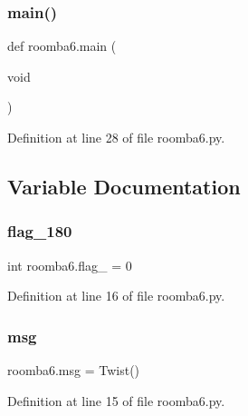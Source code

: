 \subsubsection{\texorpdfstring{main()}{main()}}
{\footnotesize\ttfamily def roomba6.\+main (\begin{DoxyParamCaption}\item[{void}]{ }\end{DoxyParamCaption})}



Definition at line 28 of file roomba6.\+py.



\subsection{Variable Documentation}
\mbox{\label{namespaceroomba6_a7d6bc24ebce5b46903c9028729ed90ff}} 
\subsubsection{\texorpdfstring{flag\_180}{flag\_180}}
{\footnotesize\ttfamily int roomba6.\+flag\+\_ = 0}



Definition at line 16 of file roomba6.\+py.

\mbox{\label{namespaceroomba6_a8340124b9a25dc0fce1d54fc7d3d1cbc}} 
\subsubsection{\texorpdfstring{msg}{msg}}
{\footnotesize\ttfamily roomba6.\+msg = Twist()}



Definition at line 15 of file roomba6.\+py.

